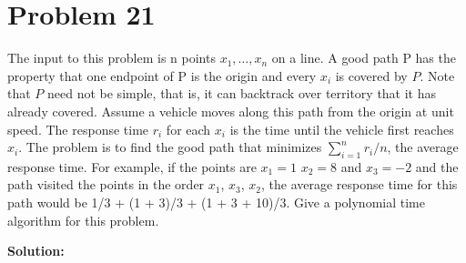 \documentclass{article}
\providecommand{\prob}[1]{\section*{Problem #1}}
\providecommand{\soln}{\textbf{Solution: }}
\begin{document}
\prob{21}
The input to this problem is n points $x_1, \dots , x_n$ on a line. A good path P has the property that one endpoint of P is the origin and every $x_i$ is covered by $P$. Note that $P$ need not be simple, that is, it can backtrack over territory that it has already covered. Assume a vehicle moves along this path from the origin at unit speed. The response time $r_i$ for each $x_i$ is the time until the vehicle first reaches $x_i$. The problem is to find the good path that minimizes $\sum_{i=1}^n r_i/n$, the average response time.
For example, if the points are $x_1 = 1$ $x_2 = 8$ and $x_3 = −2$ and the path visited the points in the order $x_1$, $x_3$, $x_2$, the average response time for this path would be 1/3 + (1 + 3)/3 + (1 + 3 + 10)/3. Give a polynomial time algorithm for this problem.

\soln
\end{document}
